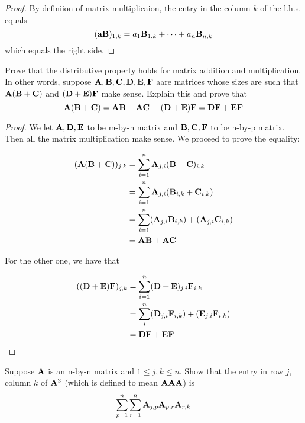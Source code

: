 \documentclass{extarticle}
\begin{document}
\begin{proof}
By definiion of matrix multiplicaion, the entry in the column \(k\) of the l.h.s. equals 
\[(\mathbf{a} \mathbf{B})_{1, k} = a_1 \mathbf{B}_{1, k} + \cdots + a_n \mathbf{B}_{n, k}\]
which equals the right side. 
\end{proof}


\begin{problem}{11}
    Prove that the distributive property holds for matrix addition and multiplication. In 
    other words, suppose \(\mathbf{A}, \mathbf{B}, \mathbf{C}, \mathbf{D}, \mathbf{E}, \mathbf{F}\) aare matrices whose sizes are such that 
    \(\mathbf{A}(\mathbf{B} + \mathbf{C})\) and \((\mathbf{D} + \mathbf{E})\mathbf{F}\) make sense. Explain this and prove that 
    \[\mathbf{A}(\mathbf{B} + \mathbf{C}) = \mathbf{A} \mathbf{B} + \mathbf{A} \mathbf{C} \ \ \ \ (\mathbf{D} + \mathbf{E})\mathbf{F} = \mathbf{D} \mathbf{F} + \mathbf{E} \mathbf{F}\]
\end{problem}

\begin{proof}
We let \(\mathbf{A}, \mathbf{D}, \mathbf{E}\) to be m-by-n matrix and \(\mathbf{B}, \mathbf{C}, \mathbf{F}\) to be n-by-p matrix. Then 
all the matrix multiplication make sense. We proceed to prove the equality:

\begin{align*}
    (\mathbf{A} (\mathbf{B} + \mathbf{C}))_{j, k} 
    &= \sum_{i=1}^{n} \mathbf{A}_{j, i} (\mathbf{B} + \mathbf{C})_{i, k} \\ 
    &= \sum_{i=1}^{n} \mathbf{A}_{j, i} (\mathbf{B}_{i, k} + \mathbf{C}_{i, k}) \\ 
    &= \sum_{i=1}^{n} (\mathbf{A}_{j, i} \mathbf{B}_{i, k}) + (\mathbf{A}_{j, i} \mathbf{C}_{i, k}) \\ 
    &= \mathbf{A} \mathbf{B} + \mathbf{A} \mathbf{C} 
\end{align*}


For the other one, we have that 

\begin{align*}
    ((\mathbf{D} + \mathbf{E})\mathbf{F})_{j, k} 
    &= \sum_{i=1}^{n} (\mathbf{D} + \mathbf{E})_{j, i} \mathbf{F}_{i, k} \\ 
    &= \sum_i^n (\mathbf{D}_{j, i} \mathbf{F}_{i, k}) + (\mathbf{E}_{j, i} \mathbf{F}_{i, k}) \\ 
    &= \mathbf{D} \mathbf{F} + \mathbf{E} \mathbf{F} 
\end{align*}

\end{proof}


\begin{problem}{13}
    Suppose \(\mathbf{A}\) is an n-by-n matrix and \(1 \leq j, k \leq n\). Show that the entry 
    in row \(j\), column \(k\) of \(\mathbf{A}^3\) (which is defined to mean \(\mathbf{A} \mathbf{A} \mathbf{A}\)) is 
    \[\sum_{p=1}^{n} \sum_{r=1}^{n} \mathbf{A}_{j, p} \mathbf{A}_{p, r} \mathbf{A}_{r, k}\]
\end{problem}
\end{document}
